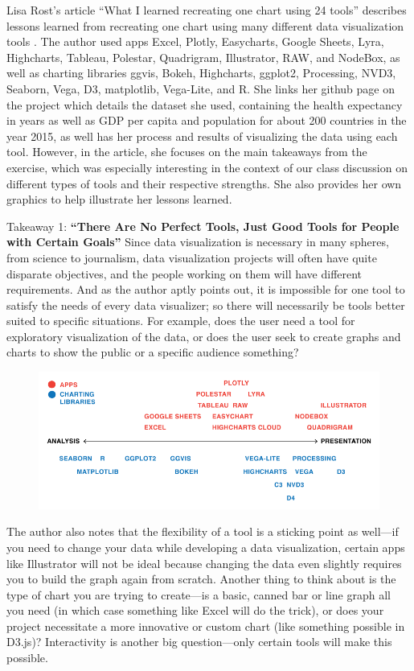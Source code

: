 \documentclass[]{book}
\theoremstyle{definition}
\theoremstyle{definition}
\theoremstyle{definition}
\theoremstyle{remark}
\begin{document}
Lisa Rost's article ``What I learned recreating one chart using 24
tools'' describes lessons learned from recreating one chart using many
different data visualization tools \citep{different_tools}. The author
used apps Excel, Plotly, Easycharts, Google Sheets, Lyra, Highcharts,
Tableau, Polestar, Quadrigram, Illustrator, RAW, and NodeBox, as well as
charting libraries ggvis, Bokeh, Highcharts, ggplot2, Processing, NVD3,
Seaborn, Vega, D3, matplotlib, Vega-Lite, and R. She links her github
page on the project which details the dataset she used, containing the
health expectancy in years as well as GDP per capita and population for
about 200 countries in the year 2015, as well has her process and
results of visualizing the data using each tool. However, in the
article, she focuses on the main takeaways from the exercise, which was
especially interesting in the context of our class discussion on
different types of tools and their respective strengths. She also
provides her own graphics to help illustrate her lessons learned.

Takeaway 1: \textbf{``There Are No Perfect Tools, Just Good Tools for
People with Certain Goals''} Since data visualization is necessary in
many spheres, from science to journalism, data visualization projects
will often have quite disparate objectives, and the people working on
them will have different requirements. And as the author aptly points
out, it is impossible for one tool to satisfy the needs of every data
visualizer; so there will necessarily be tools better suited to specific
situations. For example, does the user need a tool for exploratory
visualization of the data, or does the user seek to create graphs and
charts to show the public or a specific audience something?

\begin{figure}
\centering
\includegraphics{images/analysis_spectrum.png}
\caption{}
\end{figure}

The author also notes that the flexibility of a tool is a sticking point
as well---if you need to change your data while developing a data
visualization, certain apps like Illustrator will not be ideal because
changing the data even slightly requires you to build the graph again
from scratch. Another thing to think about is the type of chart you are
trying to create---is a basic, canned bar or line graph all you need (in
which case something like Excel will do the trick), or does your project
necessitate a more innovative or custom chart (like something possible
in D3.js)? Interactivity is another big question---only certain tools
will make this possible.
\end{document}
